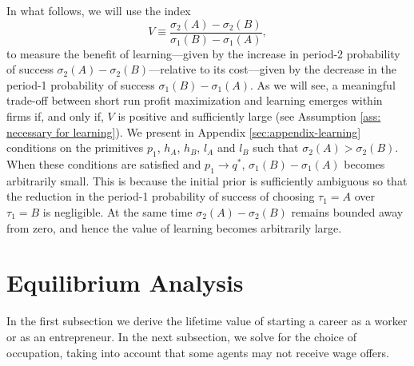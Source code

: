 \documentclass[12pt,american]{paper}
\theoremstyle{remark}
\begin{document}
In what follows, we will use the index
\[
V \equiv \frac{\sigma_2(A)-\sigma_2(B)}{\sigma_1(B)-\sigma_1(A)},
\]
to measure the benefit of learning---given by the increase in period-2 probability of success $\sigma_2(A)-\sigma_2(B)$---relative to its cost---given by the decrease in the period-1 probability of success $\sigma_1(B)-\sigma_1(A)$. As we will see, a meaningful trade-off between short run profit maximization and learning emerges within firms if, and only if, $V$ is positive and sufficiently large (see Assumption \ref{ass: necessary for learning}). We present in Appendix  \ref{sec:appendix-learning}  conditions on the primitives $p_1$, $h_A$, $h_B$, $l_A$ and $l_B$ such that $\sigma_2(A)>\sigma_2(B)$. When these conditions are satisfied and $p_1\rightarrow q^*$,  $\sigma_1(B)-\sigma_1(A)$ becomes arbitrarily small. This is because the initial prior is sufficiently ambiguous so that the reduction in the period-1 probability of success of choosing $\tau_1=A$ over $\tau_1=B$ is negligible. At the same time $\sigma_2(A)-\sigma_2(B)$ remains bounded away from zero, and hence the value of learning becomes arbitrarily large.














\section{Equilibrium Analysis}\label{sec:equilibrium}
In the first subsection we derive the lifetime value of starting a career as a worker or as an entrepreneur.  In the next subsection, we solve for the choice of occupation, taking into account that some agents may not receive wage offers.
\end{document}
